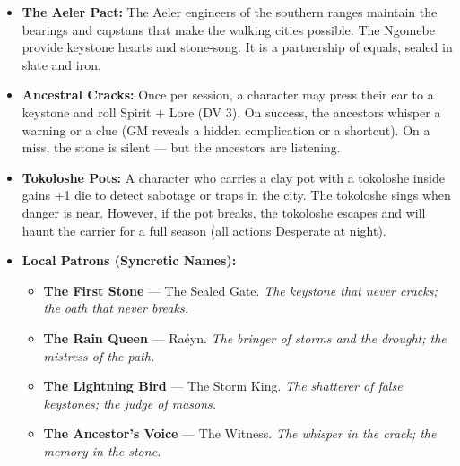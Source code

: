 \begin{itemize}
\item \textbf{The Aeler Pact:} The Aeler engineers of the southern ranges maintain the bearings and capstans that make the walking cities possible. The Ngomebe provide keystone hearts and stone-song. It is a partnership of equals, sealed in slate and iron.
\item \textbf{Ancestral Cracks:} Once per session, a character may press their ear to a keystone and roll Spirit + Lore (DV 3). On success, the ancestors whisper a warning or a clue (GM reveals a hidden complication or a shortcut). On a miss, the stone is silent --- but the ancestors are listening.
\item \textbf{Tokoloshe Pots:} A character who carries a clay pot with a tokoloshe inside gains +1 die to detect sabotage or traps in the city. The tokoloshe sings when danger is near. However, if the pot breaks, the tokoloshe escapes and will haunt the carrier for a full season (all actions Desperate at night).
\item \textbf{Local Patrons (Syncretic Names):}
  \begin{itemize}
    \item \textbf{The First Stone} --- The Sealed Gate. \textit{The keystone that never cracks; the oath that never breaks.}
    \item \textbf{The Rain Queen} --- Ra\'eyn. \textit{The bringer of storms and the drought; the mistress of the path.}
    \item \textbf{The Lightning Bird} --- The Storm King. \textit{The shatterer of false keystones; the judge of masons.}
    \item \textbf{The Ancestor's Voice} --- The Witness. \textit{The whisper in the crack; the memory in the stone.}
  \end{itemize}
\end{itemize}

